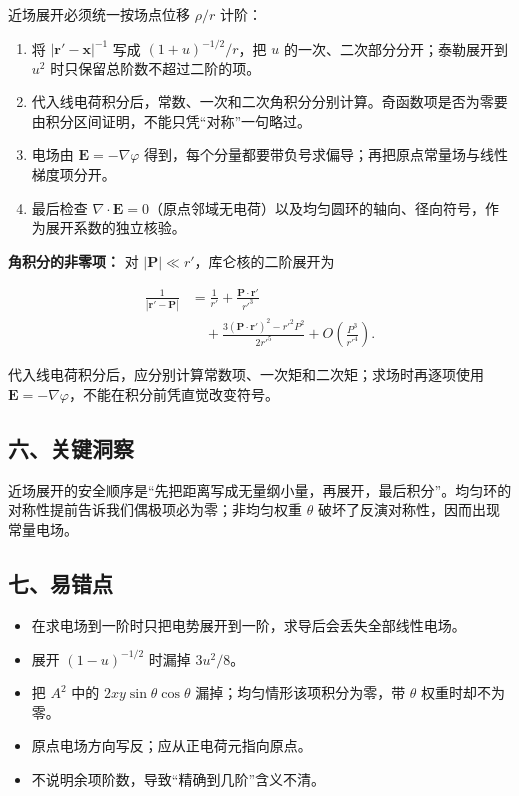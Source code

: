 \documentclass[12pt,a4paper,UTF8]{ctexart}
\newcommand{\tightlist}{\setlength{\itemsep}{0pt}\setlength{\parskip}{0pt}}
\begin{document}
近场展开必须统一按场点位移 \(\rho/r\) 计阶：

\begin{enumerate}
\def\labelenumi{\arabic{enumi}.}
\tightlist
\item
  将 \(|\boldsymbol r'-\boldsymbol x|^{-1}\) 写成 \((1+u)^{-1/2}/r\)，把
  \(u\) 的一次、二次部分分开；泰勒展开到 \(u^2\)
  时只保留总阶数不超过二阶的项。
\item
  代入线电荷积分后，常数、一次和二次角积分分别计算。奇函数项是否为零要由积分区间证明，不能只凭``对称''一句略过。
\item
  电场由 \(\boldsymbol E=-\nabla\varphi\)
  得到，每个分量都要带负号求偏导；再把原点常量场与线性梯度项分开。
\item
  最后检查
  \(\nabla\cdot\boldsymbol E=0\)（原点邻域无电荷）以及均匀圆环的轴向、径向符号，作为展开系数的独立核验。
\end{enumerate}

\textbf{角积分的非零项：} 对
\(|\boldsymbol P|\ll r'\)，库仑核的二阶展开为

\[\begin{aligned}
\frac1{|\boldsymbol r'-\boldsymbol P|}
&=\frac1{r'}
+\frac{\boldsymbol P\cdot\boldsymbol r'}{r'^3}\\
&\quad+\frac{3(\boldsymbol P\cdot\boldsymbol r')^2
-r'^2P^2}{2r'^5}
+O\!\left(\frac{P^3}{r'^4}\right).
\end{aligned}\]

代入线电荷积分后，应分别计算常数项、一次矩和二次矩；求场时再逐项使用
\(\boldsymbol E=-\nabla\varphi\)，不能在积分前凭直觉改变符号。

\subsection{六、关键洞察}\label{ux516dux5173ux952eux6d1eux5bdf-2}

近场展开的安全顺序是``先把距离写成无量纲小量，再展开，最后积分''。均匀环的对称性提前告诉我们偶极项必为零；非均匀权重
\(\theta\) 破坏了反演对称性，因而出现常量电场。

\subsection{七、易错点}\label{ux4e03ux6613ux9519ux70b9-2}

\begin{itemize}
\tightlist
\item
  在求电场到一阶时只把电势展开到一阶，求导后会丢失全部线性电场。
\item
  展开 \((1-u)^{-1/2}\) 时漏掉 \(3u^2/8\)。
\item
  把 \(A^2\) 中的 \(2xy\sin\theta\cos\theta\)
  漏掉；均匀情形该项积分为零，带 \(\theta\) 权重时却不为零。
\item
  原点电场方向写反；应从正电荷元指向原点。
\item
  不说明余项阶数，导致``精确到几阶''含义不清。
\end{itemize}
\end{document}
